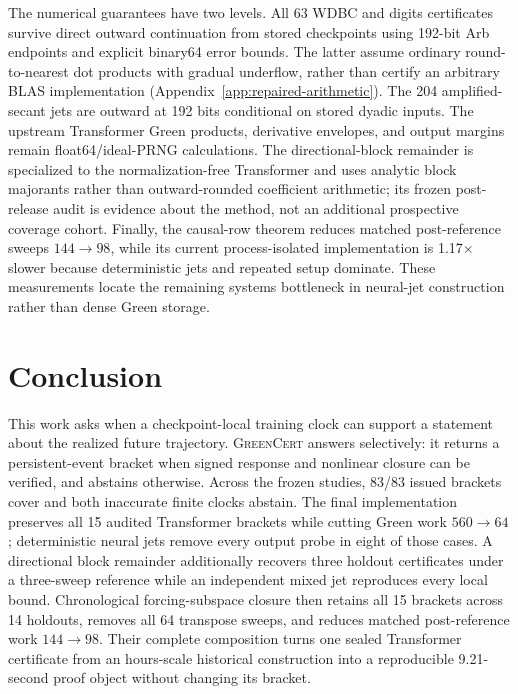 \documentclass{article}
\newcommand{\method}{\textsc{GreenCert}}
\begin{document}
The numerical guarantees have two levels.  All 63 WDBC and digits certificates
survive direct outward continuation from stored checkpoints using 192-bit Arb
endpoints and explicit binary64 error bounds.  The latter assume ordinary
round-to-nearest dot products with gradual underflow, rather than certify an
arbitrary BLAS implementation (Appendix~\ref{app:repaired-arithmetic}).  The
204 amplified-secant jets are outward at 192 bits conditional on stored dyadic
inputs.  The upstream Transformer Green products, derivative envelopes, and
output margins remain float64/ideal-PRNG calculations.  The directional-block
remainder is specialized to the normalization-free Transformer and uses
analytic block majorants rather than outward-rounded coefficient arithmetic;
its frozen post-release audit is evidence about the method, not an additional
prospective coverage cohort.  Finally, the causal-row theorem reduces matched
post-reference sweeps $144\to98$, while its current process-isolated
implementation is 1.17$\times$ slower because deterministic jets and repeated
setup dominate.  These measurements locate the remaining systems bottleneck
in neural-jet construction rather than dense Green storage.

\section{Conclusion}

This work asks when a checkpoint-local training clock can support a statement
about the realized future trajectory.  \method{} answers selectively: it
returns a persistent-event bracket when signed response and nonlinear closure
can be verified, and abstains otherwise.  Across the frozen studies, 83/83
issued brackets cover and both inaccurate finite clocks abstain.  The final
implementation preserves all 15 audited Transformer brackets while cutting
Green work $560\to64$; deterministic neural jets remove every output probe in
eight of those cases.  A directional block remainder additionally recovers
three holdout certificates under a three-sweep reference while an independent
mixed jet reproduces every local bound.  Chronological forcing-subspace closure
then retains all 15 brackets across 14 holdouts, removes all 64 transpose
sweeps, and reduces matched post-reference work $144\to98$.  Their complete
composition turns one sealed Transformer certificate from an hours-scale
historical construction into a reproducible 9.21-second proof object without
changing its bracket.

\ifdefined\arxivversion\else\clearpage\fi


\end{document}

